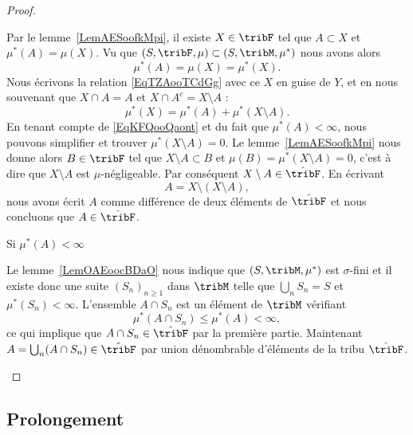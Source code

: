 \begin{proof}
\begin{subproof}
        Par le lemme~\ref{LemAESoofkMpi}, il existe \( X\in\tribF\) tel que \( A\subset X\) et \( \mu^*(A)=\mu(X)\). Vu que \( (S,\tribF,\mu)\subset (S,\tribM,\mu^*)\) nous avons alors
        \begin{equation}    \label{EqKFQooQaont}
            \mu^*(A)=\mu(X)=\mu^*(X).
        \end{equation}
        Nous écrivons la relation \eqref{EqTZAooTCdGg} avec ce \( X\) en guise de \( Y\), et en nous souvenant que \( X\cap A=A\) et \( X\cap A^c=X\setminus A\) :
        \begin{equation}
            \mu^*(X)=\mu^*(A)+\mu^*(X\setminus A).
        \end{equation}
        En tenant compte de \eqref{EqKFQooQaont} et du fait que \( \mu^*(A)<\infty\), nous pouvons simplifier et trouver \( \mu^*(X\setminus A)=0\). Le lemme~\ref{LemAESoofkMpi} nous donne alors \( B\in\tribF\) tel que \( X\setminus A\subset B\) et \( \mu(B)=\mu^*(X\setminus A)=0\), c'est à dire que \( X\setminus A\) est \( \mu\)-négligeable. Par conséquent \( X\setminus A\in\hat\tribF\). En écrivant
        \begin{equation}
            A=X\setminus(X\setminus A),
        \end{equation}
        nous avons écrit \( A\) comme différence de deux éléments de \( \hat\tribF\) et nous concluons que \( A\in\hat\tribF\).

        \item[Si \( \mu^*(A)<\infty\)]

            Le lemme~\ref{LemOAEoocBDaO} nous indique que \( (S,\tribM,\mu^*)\) est \( \sigma\)-fini et il existe donc une suite \( (S_n)_{n\geq 1}\) dans \( \tribM\) telle que \( \bigcup_nS_n=S\) et \( \mu^*(S_n)<\infty\). L'ensemble \( A\cap S_n\) est un élément de \( \tribM\) vérifiant
            \begin{equation}
                \mu^*(A\cap S_n)\leq \mu^*(A)<\infty,
            \end{equation}
            ce qui implique que \( A\cap S_n\in\hat\tribF\) par la première partie. Maintenant \( A=\bigcup_n(A\cap S_n)\in\hat\tribF\) par union dénombrable d'éléments de la tribu \( \hat\tribF\).
    \end{subproof}
\end{proof}

\subsection{Prolongement}

